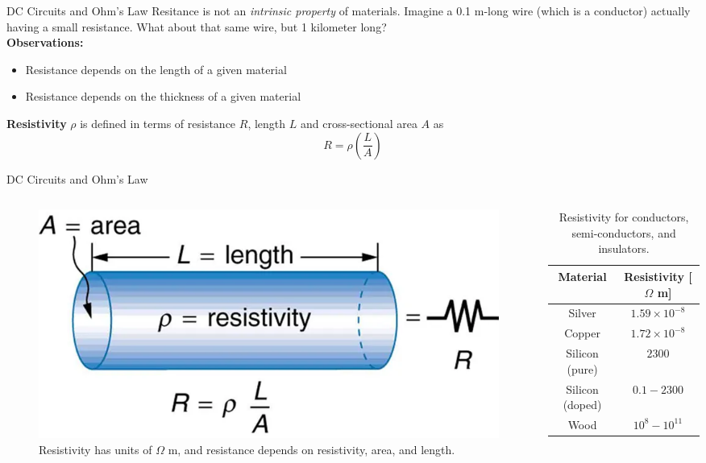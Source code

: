 \documentclass{beamer}
\begin{document}
\begin{frame}{DC Circuits and Ohm's Law}
Resitance is not an \textit{intrinsic property} of materials.  Imagine a 0.1 m-long wire (which is a conductor) actually having a small resistance.  What about that same wire, but 1 kilometer long? \\ \vspace{0.5cm}
\textbf{Observations:}
\begin{itemize}
\item Resistance depends on the length of a given material
\item Resistance depends on the thickness of a given material
\end{itemize}
\textbf{Resistivity} $\rho$ is defined in terms of resistance $R$, length $L$ and cross-sectional area $A$ as
\begin{equation}
R = \rho \left( \frac{L}{A} \right)
\end{equation}
\end{frame}

\begin{frame}{DC Circuits and Ohm's Law}
\begin{columns}[T]
\begin{column}{0.5\textwidth}
\begin{figure}
\centering
\includegraphics[width=\textwidth]{figures/resist.png}
\caption{\label{fig:rho1} Resistivity has units of $\Omega$ m, and resistance depends on resistivity, area, and length.}
\end{figure}
\end{column}
\begin{column}{0.5\textwidth}
\small
\begin{table}
\centering
\begin{tabular}{| c | c |}
\hline
Material & Resistivity [$\Omega$ m] \\ \hline
Silver & $1.59 \times 10^{-8}$ \\
Copper & $1.72 \times 10^{-8}$  \\
Silicon (pure) & $2300$ \\
Silicon (doped) & $0.1 - 2300$ \\
Wood & $10^8 - 10^{11}$ \\
\hline
\end{tabular}
\caption{\label{tab:res} Resistivity for conductors, semi-conductors, and insulators.}
\end{table}
\end{column}
\end{columns}
\end{frame}
\end{document}
